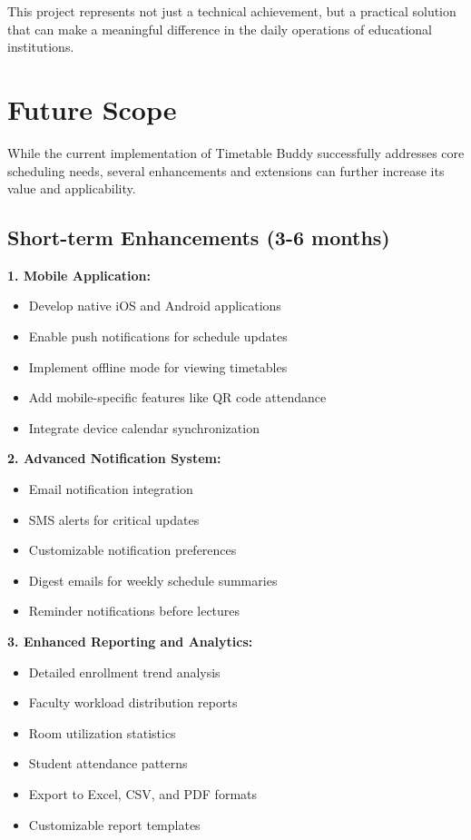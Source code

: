 This project represents not just a technical achievement, but a practical solution that can make a meaningful difference in the daily operations of educational institutions.

\section{Future Scope}

While the current implementation of Timetable Buddy successfully addresses core scheduling needs, several enhancements and extensions can further increase its value and applicability.

\subsection{Short-term Enhancements (3-6 months)}

\textbf{1. Mobile Application:}
\begin{itemize}
    \item Develop native iOS and Android applications
    \item Enable push notifications for schedule updates
    \item Implement offline mode for viewing timetables
    \item Add mobile-specific features like QR code attendance
    \item Integrate device calendar synchronization
\end{itemize}

\textbf{2. Advanced Notification System:}
\begin{itemize}
    \item Email notification integration
    \item SMS alerts for critical updates
    \item Customizable notification preferences
    \item Digest emails for weekly schedule summaries
    \item Reminder notifications before lectures
\end{itemize}

\textbf{3. Enhanced Reporting and Analytics:}
\begin{itemize}
    \item Detailed enrollment trend analysis
    \item Faculty workload distribution reports
    \item Room utilization statistics
    \item Student attendance patterns
    \item Export to Excel, CSV, and PDF formats
    \item Customizable report templates
\end{itemize}

